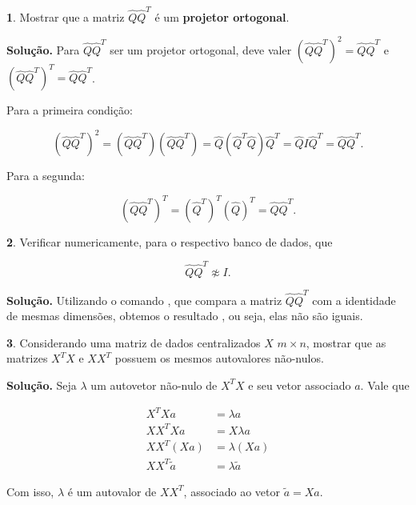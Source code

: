 \documentclass[a4paper, 12pt]{article}
\theoremstyle{definition}
\newtheorem{questao}{}
\newenvironment{solucao}{\noindent\textbf{Solução.}}{}
\theoremstyle{remark}
\begin{document}
\begin{questao}
    Mostrar que a matriz $\hat{Q}\hat{Q}^T$ é um \textbf{projetor ortogonal}.
\end{questao}

\begin{solucao}
    Para $\hat{Q}\hat{Q}^T$ ser um projetor ortogonal, deve valer $(\hat{Q}\hat{Q}^T)^2 = \hat{Q}\hat{Q}^T$ e $(\hat{Q}\hat{Q}^T)^T = \hat{Q}\hat{Q}^T$.
    
    Para a primeira condição:
    
    $$(\hat{Q}\hat{Q}^T)^2 = (\hat{Q}\hat{Q}^T)(\hat{Q}\hat{Q}^T) = \hat{Q}(\hat{Q}^T\hat{Q})\hat{Q}^T = \hat{Q}I\hat{Q}^T = \hat{Q}\hat{Q}^T.$$
    
    Para a segunda:
    
    $$(\hat{Q}\hat{Q}^T)^T = (\hat{Q}^T)^T(
    \hat{Q})^T = \hat{Q}\hat{Q}^T.$$
\end{solucao}

\begin{questao}
    Verificar numericamente, para o respectivo banco de dados, que
    
    $$\hat{Q}\hat{Q}^T \not\approx I.$$
\end{questao}

\begin{solucao}
 Utilizando o comando , que compara a matriz $\hat{Q}\hat{Q}^T$ com a identidade de mesmas dimensões, obtemos o resultado , ou seja, elas não são iguais.
\end{solucao}

\begin{questao}
    Considerando uma matriz de dados centralizados $X$ $m \times n$, mostrar que as matrizes $X^TX$ e $XX^T$ possuem os mesmos autovalores não-nulos.
\end{questao}

\begin{solucao}
    Seja $\lambda$ um autovetor não-nulo de $X^TX$ e seu vetor associado $a$. Vale que
    
    \begin{align*}
        X^TXa &= \lambda a\\
        XX^TXa &= X\lambda a\\
        XX^T(Xa) &= \lambda (Xa)\\
        XX^T\tilde{a} &= \lambda \tilde{a}
    \end{align*}
    
Com isso, $\lambda$ é um autovalor de $XX^T$, associado ao vetor $\tilde{a} = Xa$.
\end{solucao}
\end{document}
